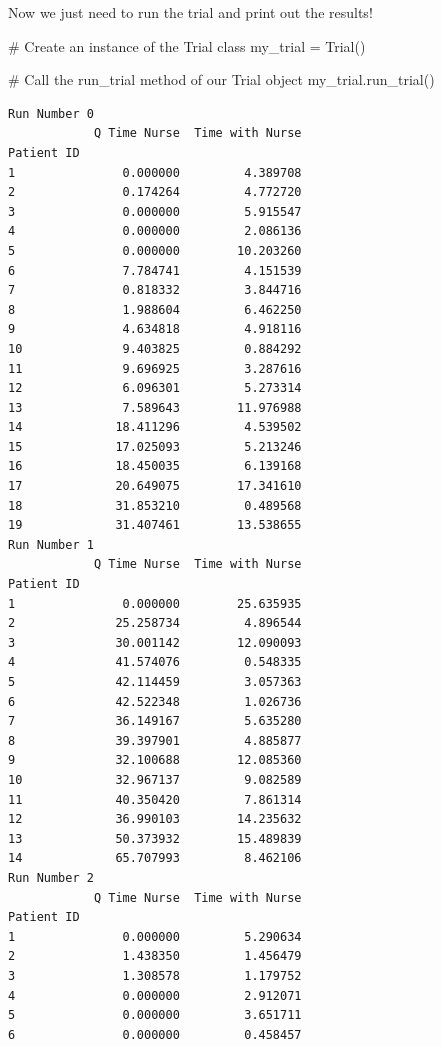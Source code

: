 \documentclass[
  letterpaper,
  DIV=11,
  numbers=noendperiod]{scrreprt}
\newenvironment{Shaded}{\begin{snugshade}}{\end{snugshade}}
\newcommand{\CommentTok}[1]{\textcolor[rgb]{0.37,0.37,0.37}{#1}}
\newcommand{\NormalTok}[1]{\textcolor[rgb]{0.00,0.23,0.31}{#1}}
\newcommand{\OperatorTok}[1]{\textcolor[rgb]{0.37,0.37,0.37}{#1}}
\begin{document}
Now we just need to run the trial and print out the results!

\begin{Shaded}
\begin{Highlighting}[]
\CommentTok{\# Create an instance of the Trial class}
\NormalTok{my\_trial }\OperatorTok{=}\NormalTok{ Trial()}

\CommentTok{\# Call the run\_trial method of our Trial object}
\NormalTok{my\_trial.run\_trial()}
\end{Highlighting}
\end{Shaded}

\begin{verbatim}
Run Number 0
            Q Time Nurse  Time with Nurse
Patient ID                               
1               0.000000         4.389708
2               0.174264         4.772720
3               0.000000         5.915547
4               0.000000         2.086136
5               0.000000        10.203260
6               7.784741         4.151539
7               0.818332         3.844716
8               1.988604         6.462250
9               4.634818         4.918116
10              9.403825         0.884292
11              9.696925         3.287616
12              6.096301         5.273314
13              7.589643        11.976988
14             18.411296         4.539502
15             17.025093         5.213246
16             18.450035         6.139168
17             20.649075        17.341610
18             31.853210         0.489568
19             31.407461        13.538655
Run Number 1
            Q Time Nurse  Time with Nurse
Patient ID                               
1               0.000000        25.635935
2              25.258734         4.896544
3              30.001142        12.090093
4              41.574076         0.548335
5              42.114459         3.057363
6              42.522348         1.026736
7              36.149167         5.635280
8              39.397901         4.885877
9              32.100688        12.085360
10             32.967137         9.082589
11             40.350420         7.861314
12             36.990103        14.235632
13             50.373932        15.489839
14             65.707993         8.462106
Run Number 2
            Q Time Nurse  Time with Nurse
Patient ID                               
1               0.000000         5.290634
2               1.438350         1.456479
3               1.308578         1.179752
4               0.000000         2.912071
5               0.000000         3.651711
6               0.000000         0.458457

\end{verbatim}
\end{document}
